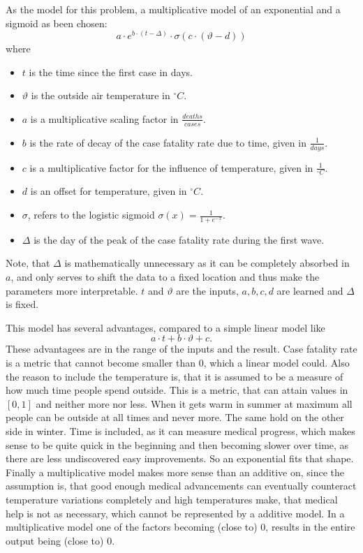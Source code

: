 \documentclass{article}
\begin{document}
As the model for this problem, a multiplicative model of an exponential and a sigmoid as been chosen: \begin{equation}
  a \cdot e^{b \cdot (t - \Delta)} \cdot \sigma \left( c \cdot (\vartheta - d) \right) 
\end{equation} where \begin{itemize}
  \item $t$ is the time since the first case in days.
  \item $\vartheta$ is the outside air temperature in $^\circ C$.
  \item $a$ is a multiplicative scaling factor in $\frac{deaths}{cases}$.
  \item $b$ is the rate of decay of the case fatality rate due to time, given in $\frac{1}{days}$.
  \item $c$ is a multiplicative factor for the influence of temperature, given in $\frac{1}{^\circ C}$.
  \item $d$ is an offset for temperature, given in $^\circ C$.
  \item $\sigma$, refers to the logistic sigmoid $\sigma(x) = \frac{1}{1 + e^{-x}}$.
  \item $\Delta$ is the day of the peak of the case fatality rate during the first wave.
\end{itemize}

Note, that $\Delta$ is mathematically unnecessary as it can be completely absorbed in $a$, and only serves to shift the data to a fixed location and thus make the parameters more interpretable. $t$ and $\vartheta$ are the inputs, $a, b, c, d$ are learned and $\Delta$ is fixed.

This model has several advantages, compared to a simple linear model like \begin{equation}
  a \cdot t + b \cdot \vartheta + c.
\end{equation}
These advantagees are in the range of the inputs and the result. Case fatality rate is a metric that cannot become smaller than 0, which a linear model could. 
Also the reason to include the temperature is, that it is assumed to be a measure of how much time people spend outside. This is a metric, that can attain values in $[0, 1]$ and neither more nor less. When it gets warm in summer at maximum all people can be outside at all times and never more. The same hold on the other side in winter. 
Time is included, as it can measure medical progress, which makes sense to be quite quick in the beginning and then becoming slower over time, as there are less undiscovered easy improvements. So an exponential fits that shape.
Finally a multiplicative model makes more sense than an additive on, since the assumption is, that good enough medical advancements can eventually counteract temperature variations completely and high temperatures make, that medical help is not as necessary, which cannot be represented by a additive model. In a multiplicative model one of the factors becoming (close to) 0, results in the entire output being (close to) 0.
\end{document}
